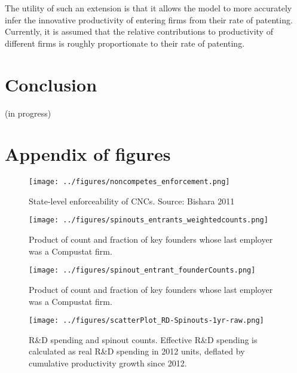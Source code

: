 \documentclass[11pt,english]{article}
\theoremstyle{remark}
\begin{document}
The utility of such an extension is that it allows the model to more accurately infer the innovative productivity of entering firms from their rate of patenting. Currently, it is assumed that the relative contributions to productivity of different firms is roughly proportionate to their rate of patenting.

\section{Conclusion}\label{conclusion}

(in progress)



\break
\appendix
\renewcommand\thefigure{\thesection.\arabic{figure}}  
\setcounter{figure}{0}


\section{Appendix of figures}\renewcommand{\thetable}{A\arabic{table}}

\begin{figure}	
	\center
	\caption{State-level enforceability of CNCs. Source: Bishara 2011}
	\texttt{[image: ../figures/noncompetes\_enforcement.png]}
	\label{noncompetes_enforcement}
\end{figure}

\begin{figure}[h]
	\centering
	\texttt{[image: ../figures/spinouts\_entrants\_weightedcounts.png]}
	\caption{Product of count and fraction of key founders whose last employer was a Compustat firm.}
	\label{spinout_entrants_counts_weighted}
\end{figure} 

\begin{figure}[p]
	\centering
	\texttt{[image: ../figures/spinout\_entrant\_founderCounts.png]}
	\caption{Product of count and fraction of key founders whose last employer was a Compustat firm.}
	\label{spinout_entrants_foundercounts}
\end{figure}

\begin{figure}[p]
	\centering
	\texttt{[image: ../figures/scatterPlot\_RD-Spinouts-1yr-raw.png]}
	\caption{R\&D spending and spinout counts. Effective R\&D spending is calculated as real R\&D spending in 2012 units, deflated by cumulative productivity growth since 2012.}
	\label{scatter_rd_spinoutcounts}
\end{figure}
\end{document}

